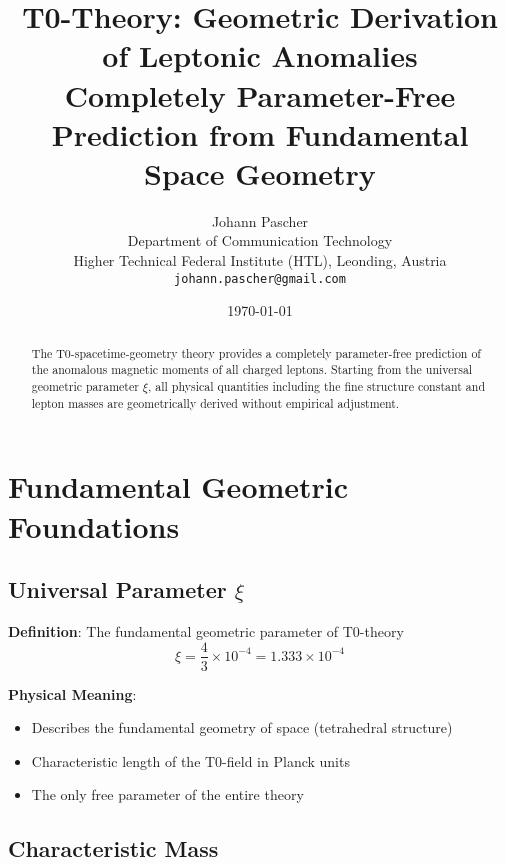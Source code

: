 \documentclass[12pt,a4paper]{article}
\newcommand{\xipar}{\xi}
\begin{document}
	
	\title{T0-Theory: Geometric Derivation of Leptonic Anomalies \\
		\large Completely Parameter-Free Prediction from Fundamental Space Geometry}
	\author{Johann Pascher\\
		Department of Communication Technology\\
		Higher Technical Federal Institute (HTL), Leonding, Austria\\
		\texttt{johann.pascher@gmail.com}}
	\date{\today}
	
	\maketitle
	
	\begin{abstract}
		The T0-spacetime-geometry theory provides a completely parameter-free prediction of the anomalous magnetic moments of all charged leptons. Starting from the universal geometric parameter $\xipar$, all physical quantities including the fine structure constant and lepton masses are geometrically derived without empirical adjustment.
	\end{abstract}
	
	\tableofcontents
	\newpage
	
	\section{Fundamental Geometric Foundations}
	
	\subsection{Universal Parameter $\xipar$}
	
	\textbf{Definition}: The fundamental geometric parameter of T0-theory
	\begin{equation}
		\xipar = \frac{4}{3} \times 10^{-4} = 1{.}333 \times 10^{-4}
	\end{equation}
	
	\textbf{Physical Meaning}:
	\begin{itemize}
		\item Describes the fundamental geometry of space (tetrahedral structure)
		\item Characteristic length of the T0-field in Planck units
		\item The only free parameter of the entire theory
	\end{itemize}
	
	\subsection{Characteristic Mass}
	
\end{document}
